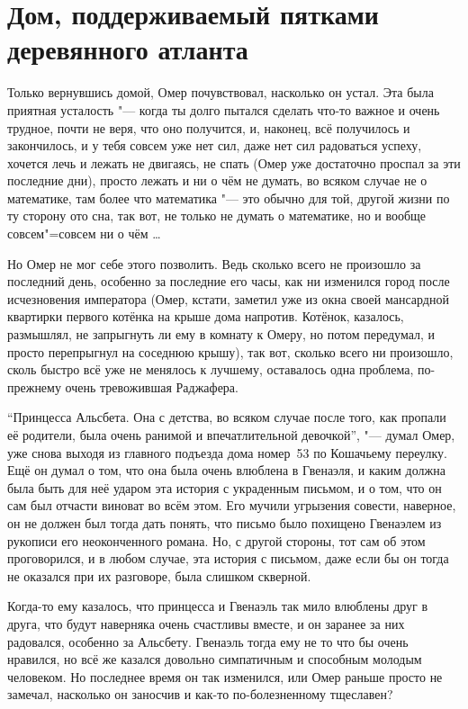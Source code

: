 \section{Дом, поддерживаемый пятками деревянного атланта}

Только вернувшись домой, Омер почувствовал, насколько он устал.
Эта была приятная усталость "--- когда ты долго пытался сделать что-то важное и
очень трудное, почти не веря, что оно получится, и, наконец, всё получилось и
закончилось, и у тебя совсем уже нет сил, даже нет сил радоваться успеху,
хочется лечь и лежать не двигаясь, не спать (Омер уже достаточно проспал за эти
последние дни), просто лежать и ни о чём не думать, во всяком случае не о
математике, там более что математика "--- это обычно для той, другой жизни по ту
сторону ото сна, так вот, не только не думать о математике, но и вообще
совсем"=совсем ни о чём \ldots

Но Омер не мог себе этого позволить.
Ведь сколько всего не произошло за последний день, особенно за последние его
часы, как ни изменился город после исчезновения императора (Омер, кстати,
заметил уже из окна своей мансардной квартирки первого котёнка на крыше дома
напротив. Котёнок, казалось, размышлял, не запрыгнуть ли ему в комнату к Омеру,
но потом передумал, и просто перепрыгнул на соседнюю крышу), так вот, сколько
всего ни произошло, сколь быстро всё уже не менялось к лучшему, оставалось одна
проблема, по-прежнему очень тревожившая Раджафера.

\enquote{Принцесса Альсбета.
Она с детства, во всяком случае после того, как пропали её родители, была очень
ранимой и впечатлительной девочкой}, "--- думал Омер, уже снова выходя из
главного подъезда дома номер~53 по Кошачьему переулку.
Ещё он думал о том, что она была очень влюблена в Гвенаэля, и каким должна была
быть для неё ударом эта история с украденным письмом, и о том, что он сам был
отчасти виноват во всём этом.
Его мучили угрызения совести, наверное, он не должен был тогда дать понять, что
письмо было похищено Гвенаэлем из рукописи его неоконченного романа.
Но, с другой стороны, тот сам об этом проговорился, и в любом случае, эта
история с письмом, даже если бы он тогда не оказался при их разговоре, была
слишком скверной.

Когда-то ему казалось, что принцесса и Гвенаэль так мило влюблены друг в друга,
что будут наверняка очень счастливы вместе, и он заранее за них радовался,
особенно за Альсбету.
Гвенаэль тогда ему не то что бы очень нравился, но всё же казался довольно
симпатичным и способным молодым человеком.
Но последнее время он так изменился, или Омер раньше просто не замечал,
насколько он заносчив и как-то по-болезненному тщеславен?

